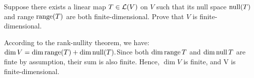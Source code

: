 %
%


\setcounter{xrcscount}{14} %
\begin{xrcs}
  Suppose there exists a linear map $T \in \mathcal{L}(V)$ on $V$ such that its null space $\operatorname{null}(T)$ and range $\operatorname{range}(T)$ are both finite-dimensional. Prove that $V$ is finite-dimensional.

  \begin{prf}
    According to the rank-nullity theorem, we have: $ \dim V = \dim \operatorname{range}(T) + \dim \operatorname{null}(T). $Since both $\dim \operatorname{range} T$ and $\dim \operatorname{null} T$ are finte by assumption, their sum is also finite. Hence, $\dim V$ is finite, and V is finite-dimensional.
  \end{prf}
\end{xrcs}

